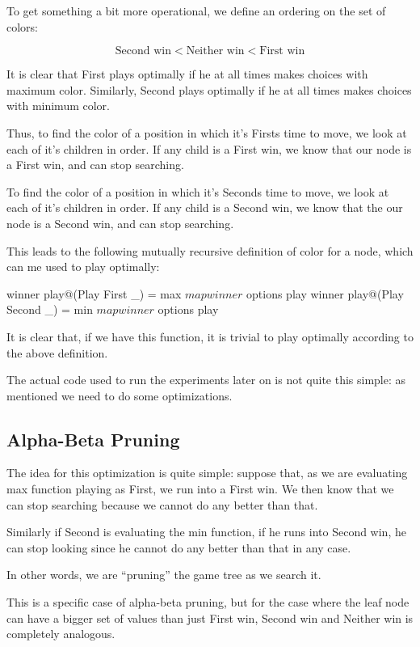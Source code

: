 To get something a bit more operational, we define an ordering on the set of colors:

\[
  \text{Second win} < \text{Neither win} < \text{First win}
\]

It is clear that First plays optimally if he at all times makes choices with maximum color.
Similarly, Second plays optimally if he at all times makes choices with minimum color.

Thus, to find the color of a position in which it's Firsts time to move, we look at each of it's children in order.
If any child is a First win, we know that our node is a First win, and can stop searching.

To find the color of a position in which it's Seconds time to move, we look at each of it's children in order.
If any child is a Second win, we know that the our node is a Second win, and can stop searching.

This leads to the following mutually recursive definition of color for a node, which can me used to play optimally:

\begin{code}
  winner play@(Play First _) = 
    max $ map winner $ options play
  winner play@(Play Second _) = 
    min $ map winner $ options play
\end{code}


It is clear that, if we have this function, it is trivial to play optimally according to the above definition.

The actual code used to run the experiments later on is not quite this simple: as mentioned we need to do some optimizations.

\subsection {Alpha-Beta Pruning}

The idea for this optimization is quite simple: suppose that, as we are evaluating max function playing as First, we run into a First win.
We then know that we can stop searching because we cannot do any better than that.

Similarly if Second is evaluating the min function, if he runs into Second win, he can stop looking since he cannot do any better than that in any case.

In other words, we are ``pruning'' the game tree as we search it.


This is a specific case of alpha-beta pruning, but for the case where the leaf node can have a bigger set of values than just First win, Second win and Neither win is completely analogous.

